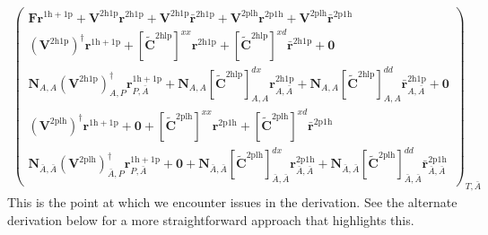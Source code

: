 \begin{align}
    \begin{pmatrix}
\bm{F}\bm{r}^{1\mathrm{h}+1\mathrm{p}} + \bm{V}^{2\mathrm{h}1\mathrm{p}}\bm{r}^{2\mathrm{h}1\mathrm{p}} + \bm{V}^{2\mathrm{h}1\mathrm{p}}\bm{\bar{r}}^{2\mathrm{h}1\mathrm{p}} + \bm{V}^{2\mathrm{plh}}\bm{r}^{2\mathrm{p}1\mathrm{h}} + \bm{V}^{2\mathrm{plh}}\bm{\bar{r}}^{2\mathrm{p}1\mathrm{h}} \\
\left(\bm{V}^{2\mathrm{h1p}}\right)^{\dagger} \bm{r}^{1\mathrm{h}+1\mathrm{p}} + [\bm{\tilde{C}}^{2\mathrm{hlp}}]^{xx} \bm{r}^{2\mathrm{h}1\mathrm{p}} + [\bm{\tilde{C}}^{2\mathrm{hlp}}]^{xd} \bm{\bar{r}}^{2\mathrm{h}1\mathrm{p}} + \bm{0} \\
\bm{N}_{A,A}\left(\bm{V}^{2\mathrm{h1p}}\right)^{\dagger}_{A,P} \bm{r}^{1\mathrm{h}+1\mathrm{p}}_{P,\bar{A}} + \bm{N}_{A,A}[\bm{\tilde{C}}^{2\mathrm{hlp}}]^{dx}_{A,A} \bm{r}^{2\mathrm{h}1\mathrm{p}}_{A,\bar{A}} + \bm{N}_{A,A}[\bm{\tilde{C}}^{2\mathrm{hlp}}]^{dd}_{A,A} \bm{\bar{r}}^{2\mathrm{h}1\mathrm{p}}_{A,\bar{A}} + \bm{0} \\
\left(\bm{V}^{2\mathrm{plh}}\right)^{\dagger} \bm{r}^{1\mathrm{h}+1\mathrm{p}} + \bm{0} + [\bm{\tilde{C}}^{2\mathrm{plh}}]^{xx} \bm{r}^{2\mathrm{p}1\mathrm{h}} + [\bm{\tilde{C}}^{2\mathrm{plh}}]^{xd} \bm{\bar{r}}^{2\mathrm{p}1\mathrm{h}} \\
\bm{N}_{\bar{A}, \bar{A}}\left(\bm{V}^{2\mathrm{plh}}\right)^{\dagger}_{\bar{A},P} \bm{r}^{1\mathrm{h}+1\mathrm{p}}_{P,\bar{A}} + \bm{0} + \bm{N}_{\bar{A}, \bar{A}}[\bm{\tilde{C}}^{2\mathrm{plh}}]^{dx}_{\bar{A},\bar{A}} \bm{r}^{2\mathrm{p}1\mathrm{h}}_{\bar{A},\bar{A}} + \bm{N}_{\bar{A}, \bar{A}}[\bm{\tilde{C}}^{2\mathrm{plh}}]^{dd}_{\bar{A},\bar{A}} \bm{\bar{r}}^{2\mathrm{p}1\mathrm{h}}_{\bar{A},\bar{A}}
\end{pmatrix}_{T,\bar{A}}
\end{align}
This is the point at which we encounter issues in the derivation. See the alternate derivation below for a more straightforward approach that highlights this.
